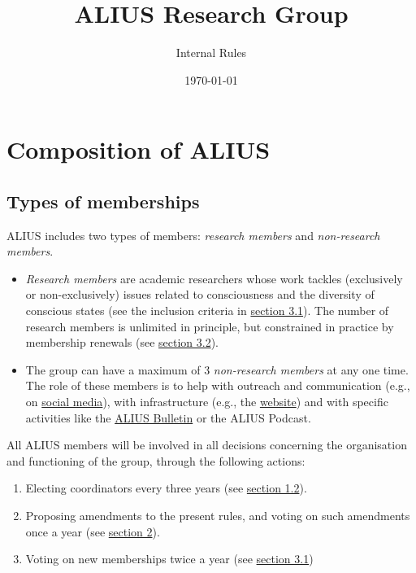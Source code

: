 \documentclass[a4paper, 11pt]{scrartcl}
\begin{document}
\title{\vspace{-2cm} \LARGE ALIUS Research Group}
\subtitle{\Large Internal Rules}
\author{}
\date{\large \today}
\maketitle

\section{Composition of ALIUS}
\subsection{Types of memberships}

ALIUS includes two types of members: \emph{research members} and \emph{non-research members}.

\begin{itemize}

\item \emph{Research members} are academic researchers whose work tackles (exclusively or non-exclusively) issues related to consciousness and the diversity of conscious states (see the inclusion criteria in \hyperref[new_memberships]{section 3.1}). The number of research members is unlimited in principle, but constrained in practice by membership renewals (see \hyperref[membership_renewal]{section 3.2}). 

\item The group can have a maximum of 3 \emph{non-research members} at any one time. The role of these members is to help with outreach and communication (e.g., on \href{https://www.facebook.com/aliusresearch/}{social media}), with infrastructure (e.g., the \href{https://www.aliusresearch.org/}{website}) and with specific activities like the \href{https://www.aliusresearch.org/bulletin.html}{ALIUS Bulletin} or the ALIUS Podcast.


\end{itemize}

\noindent All ALIUS members will be involved in all decisions concerning the organisation and functioning of the group, through the following actions:

\begin{enumerate}
\item Electing coordinators every three years (see \hyperref[coordinators]{section 1.2}).
\item Proposing amendments to the present rules, and voting on such amendments once a year (see \hyperref[modif]{section 2}).
\item Voting on new memberships twice a year (see \hyperref[new_memberships]{section 3.1})

\end{enumerate}
\end{document}
